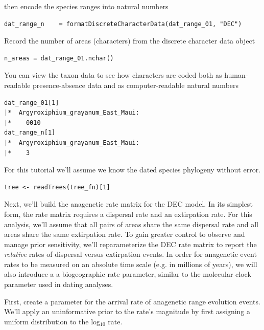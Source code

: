 then encode the species ranges into natural numbers

\begin{snugshade}
\begin{lstlisting}
dat_range_n    = formatDiscreteCharacterData(dat_range_01, "DEC")
\end{lstlisting}
\end{snugshade}


Record the number of areas (characters) from the discrete character data object

\begin{snugshade}
\begin{lstlisting}
n_areas = dat_range_01.nchar()
\end{lstlisting}
\end{snugshade}

You can view the taxon data to see how characters are coded both as human-readable presence-absence data and as computer-readable natural numbers
\begin{snugshade}
\begin{lstlisting}
dat_range_01[1]
|*  Argyroxiphium_grayanum_East_Maui:
|*    0010
dat_range_n[1]
|*  Argyroxiphium_grayanum_East_Maui:
|*    3
\end{lstlisting}
\end{snugshade}

For this tutorial we'll assume we know the dated species phylogeny without error.

\begin{snugshade}
\begin{lstlisting}
tree <- readTrees(tree_fn)[1]
\end{lstlisting}
\end{snugshade}

Next, we'll build the anagenetic rate matrix for the DEC model.
In its simplest form, the rate matrix requires a dispersal rate and an extirpation rate.
For this analysis, we'll assume that all pairs of areas share the same dispersal rate and all areas share the same extirpation rate.
To gain greater control to observe and manage prior sensitivity, we'll reparameterize the DEC rate matrix to report the {\it relative} rates of dispersal versus extirpation events.
In order for anagenetic event rates to be measured on an absolute time scale (e.g. in millions of years), we will also introduce a a biogeographic rate parameter, similar to the molecular clock parameter used in dating analyses.

First, create a parameter for the arrival rate of anagenetic range evolution events.
We'll apply an uninformative prior to the rate's magnitude by first assigning a uniform distribution to the log$_{10}$ rate.

